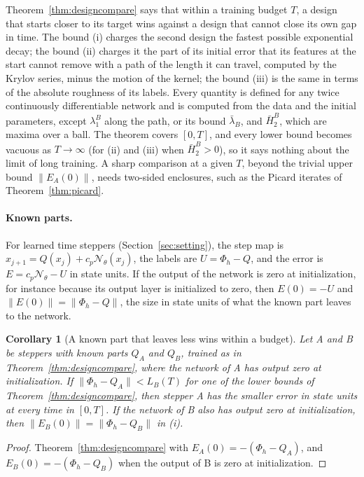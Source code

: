 \documentclass[11pt]{article}
\newtheorem{corollary}{Corollary}
\theoremstyle{definition}
\theoremstyle{remark}
\newcommand{\Net}{\mathcal{N}_\theta}    %
\begin{document}
Theorem~\ref{thm:designcompare} says that within a training budget $T$, a design that starts closer to its target wins against a design that cannot close its own gap in time.
The bound (i) charges the second design the fastest possible exponential decay; the bound (ii) charges it the part of its initial error that its features at the start cannot remove with a path of the length it can travel, computed by the Krylov series, minus the motion of the kernel; the bound (iii) is the same in terms of the absolute roughness of its labels.
Every quantity is defined for any twice continuously differentiable network and is computed from the data and the initial parameters, except $\lambda_1^B$ along the path, or its bound $\bar\lambda_B$, and $\bar H_2^B$, which are maxima over a ball.
The theorem covers $[0,T]$, and every lower bound becomes vacuous as $T\to\infty$ (for (ii) and (iii) when $\bar H_2^B > 0$), so it says nothing about the limit of long training.
A sharp comparison at a given $T$, beyond the trivial upper bound $\|E_A(0)\|$, needs two-sided enclosures, such as the Picard iterates of Theorem~\ref{thm:picard}.

\paragraph{Known parts.}
For learned time steppers (Section~\ref{sec:setting}), the step map is $x_{j+1} = Q(x_j) + c_p\Net(x_j)$, the labels are $U = \Phi_h - Q$, and the error is $E = c_p\Net - U$ in state units.
If the output of the network is zero at initialization, for instance because its output layer is initialized to zero, then $E(0) = -U$ and $\|E(0)\| = \|\Phi_h - Q\|$, the size in state units of what the known part leaves to the network.

\begin{corollary}[A known part that leaves less wins within a budget]\label{cor:knownpart}
Let A and B be steppers with known parts $Q_A$ and $Q_B$, trained as in Theorem~\ref{thm:designcompare}, where the network of A has output zero at initialization.
If $\|\Phi_h - Q_A\| < L_B(T)$ for one of the lower bounds of Theorem~\ref{thm:designcompare}, then stepper A has the smaller error in state units at every time in $[0,T]$.
If the network of B also has output zero at initialization, then $\|E_B(0)\| = \|\Phi_h - Q_B\|$ in (i).
\end{corollary}

\begin{proof}
Theorem~\ref{thm:designcompare} with $E_A(0) = -(\Phi_h - Q_A)$, and $E_B(0) = -(\Phi_h - Q_B)$ when the output of B is zero at initialization.
\end{proof}
\end{document}
